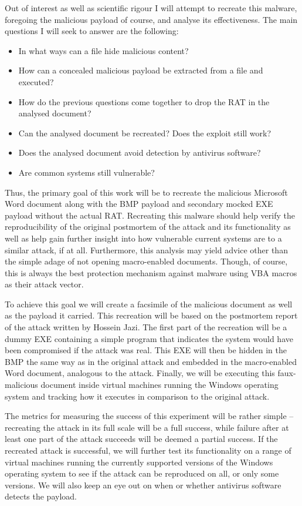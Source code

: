 Out of interest as well as scientific rigour I will attempt to recreate this malware, foregoing the malicious payload
of course, and analyse its effectiveness. The main questions I will seek to answer are the following:
\begin{itemize}
  \item In what ways can a file hide malicious content?
  \item How can a concealed malicious payload be extracted from a file and executed?
  \item How do the previous questions come together to drop the RAT in the analysed document?
  \item Can the analysed document be recreated? Does the exploit still work?
  \item Does the analysed document avoid detection by antivirus software?
  \item Are common systems still vulnerable?
\end{itemize}

Thus, the primary goal of this work will be to recreate the malicious Microsoft Word document along with the \acrshort{BMP}
payload and secondary mocked \acrfull{EXE} payload without the actual \acrlong{RAT}. Recreating this malware should help
verify the reproducibility of the original postmortem of the attack and its functionality as well as help gain further
insight into how vulnerable current systems are to a similar attack, if at all. Furthermore, this analysis may yield
advice other than the simple adage of not opening macro-enabled documents. Though, of course, this is always the best
protection mechanism against malware using \acrshort{VBA} macros as their attack vector.

To achieve this goal we will create a facsimile of the malicious document as well as the payload it carried.
This recreation will be based on the postmortem report of the attack written by Hossein Jazi. 
The first part of the recreation will be a dummy \acrlong{EXE} containing a simple program that indicates the 
system would have been compromised if the attack was real. This \acrshort{EXE} will then be hidden in the \acrshort{BMP}
the same way as in the original attack and embedded in the macro-enabled Word document, analogous to the attack.
Finally, we will be executing this faux-malicious document inside virtual machines running the Windows operating system
and tracking how it executes in comparison to the original attack. 

The metrics for measuring the success of this experiment will be rather simple -- recreating the attack in its full
scale will be a full success, while failure after at least one part of the attack succeeds will be deemed a partial
success. If the recreated attack is successful, we will further test its functionality on a range of virtual machines
running the currently supported versions of the Windows operating system to see if the attack can be reproduced on all,
or only some versions. We will also keep an eye out on when or whether antivirus software detects the payload.

